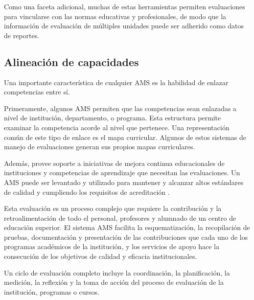 Como una faceta adicional, muchas de estas herramientas permiten evaluaciones para vincularse con las normas educativas y profesionales, de modo que la información de evaluación de múltiples unidades puede ser adherido como datos de reportes.

\subsection{Alineación de capacidades}
Una importante característica de cualquier AMS es la habilidad de enlazar competencias entre sí.

Primeramente, algunos AMS permiten que las competencias sean enlazadas a nivel de institución, departamento, o programa. Esta estructura permite examinar la competencia acorde al nivel que pertenece. Una representación común de este tipo de enlace es el mapa curricular. Algunos de estos sistemas de manejo de evaluaciones generan sus propios mapas curriculares.

Además, provee soporte a iniciativas de mejora continua educacionales de instituciones y competencias de aprendizaje que necesitan las evaluaciones. Un AMS puede ser levantado y utilizado para mantener y alcanzar altos estándares de calidad y cumpliendo los requisitos de acreditación \citep{kuh_using_2015}.

Esta evaluación es un proceso complejo que requiere la contribución y la retroalimentación de todo el personal, profesores y alumnado de un centro de educación superior. El sistema AMS facilita la esquematización, la recopilación de pruebas, documentación y presentación de las contribuciones que cada uno de los programas académicos de la institución, y los servicios de apoyo hace la consecución de los objetivos de calidad y eficacia institucionales.

Un ciclo de evaluación completo incluye la coordinación, la planificación, la medición, la reflexión y la toma de acción del proceso de evaluación de la institución, programas o cursos.